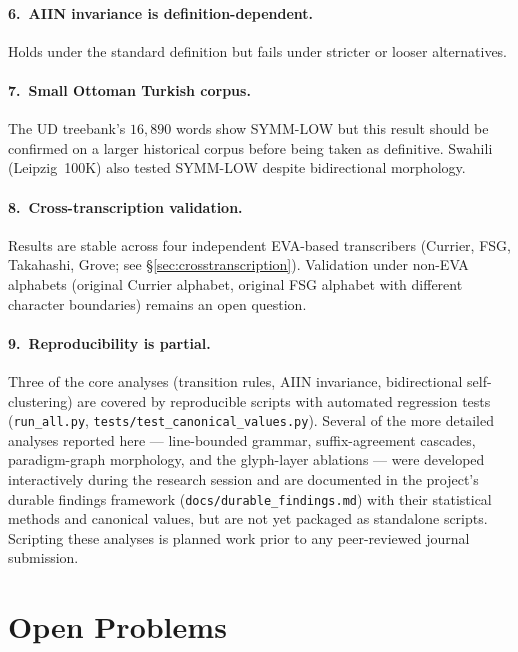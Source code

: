 \documentclass[11pt]{article}
\begin{document}
\paragraph{6.~AIIN invariance is definition-dependent.} Holds under the
standard definition but fails under stricter or looser alternatives.

\paragraph{7.~Small Ottoman Turkish corpus.} The UD treebank's $16{,}890$
words show SYMM-LOW but this result should be confirmed on a larger
historical corpus before being taken as definitive. Swahili
(Leipzig~100K) also tested SYMM-LOW despite bidirectional morphology.

\paragraph{8.~Cross-transcription validation.} Results are stable
across four independent EVA-based transcribers (Currier, FSG, Takahashi,
Grove; see \S\ref{sec:crosstranscription}). Validation under non-EVA
alphabets (original Currier alphabet, original FSG alphabet with
different character boundaries) remains an open question.

\paragraph{9.~Reproducibility is partial.} Three of the core analyses
(transition rules, AIIN invariance, bidirectional self-clustering) are
covered by reproducible scripts with automated regression tests
(\texttt{run\_all.py}, \texttt{tests/test\_canonical\_values.py}). Several
of the more detailed analyses reported here --- line-bounded grammar,
suffix-agreement cascades, paradigm-graph morphology, and the glyph-layer
ablations --- were developed interactively during the research session
and are documented in the project's durable findings framework
(\texttt{docs/durable\_findings.md}) with their statistical methods and
canonical values, but are not yet packaged as standalone scripts.
Scripting these analyses is planned work prior to any peer-reviewed
journal submission.

\section{Open Problems}
\label{sec:open}
\end{document}
